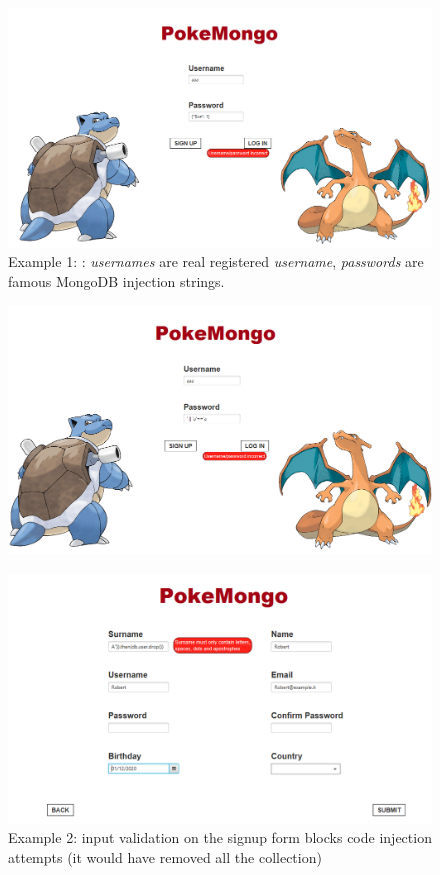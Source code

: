\begin{figure}[H]
	\centering
	\caption{Example 1: : \textit{usernames} are real registered \textit{username}, \textit{passwords} are famous MongoDB injection strings.}
	\includegraphics[width=\textwidth]{img/privacy_1.png}
\end{figure}
\begin{figure}[H]
	\centering
	\includegraphics[width=\textwidth]{img/privacy_2.png}
\end{figure}


\begin{figure}[H]
	\centering
	\caption{Example 2: input validation on the signup form blocks code injection attempts (it would have removed all the collection)}
	\includegraphics[width=\textwidth]{img/privacy_3.png}
\end{figure}



